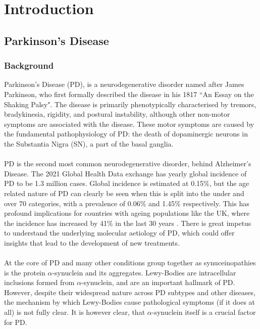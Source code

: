 \documentclass{article}
\begin{document}
\section{Introduction}
\subsection{Parkinson's Disease}
\subsubsection{Background}  
\label{subsubsec:Background}
Parkinson's Disease (PD), is a neurodegenerative disorder named after James Parkinson, who first formally described the disease in his 1817 ``An Essay on the Shaking Palsy"\cite{Parkinson2002AnPalsy}. The disease is primarily phenotypically characterised by tremors, bradykinesia, rigidity, and postural instability, although other non-motor symptoms are associated with the disease. These motor symptoms are caused by the fundamental pathophysiology of PD: the death of dopaminergic neurons in the Substantia Nigra (SN), a part of the basal ganglia. 
\\
\\PD is the second most common neurodegenerative disorder, behind Alzheimer's Disease. The 2021 Global Health Data exchange\cite{Ferrari2024Global2021} has yearly global incidence of PD to be 1.3 million cases. Global incidence is estimated at 0.15\%, but the age related nature of PD can clearly be seen when this is split into the under and over 70 categories, with a prevalence of 0.06\% and 1.45\% respectively. This has profound implications for countries with ageing populations like the UK, where the incidence has increased by 41\% in the last 30 years \cite{Ferrari2024Global2021}. There is great impetus to understand the underlying molecular aetiology of PD, which could offer insights that lead to the development of new treatments.
\\
\\At the core of PD and many other conditions group together as synuceinopathies is the protein $\alpha$-synuclein and its aggregates. Lewy-Bodies are intracellular inclusions formed from $\alpha$-synuclein\cite{Spillantini1997-SynucleinBodies}, and are an important hallmark of PD. However, despite their widespread nature across PD subtypes and other diseases, the mechanism by which Lewy-Bodies cause pathological symptoms (if it does at all) is not fully clear\cite{Riederer2023LewyDisease}. It is however clear, that $\alpha$-synuclein itself is a crucial factor for PD.
\end{document}
